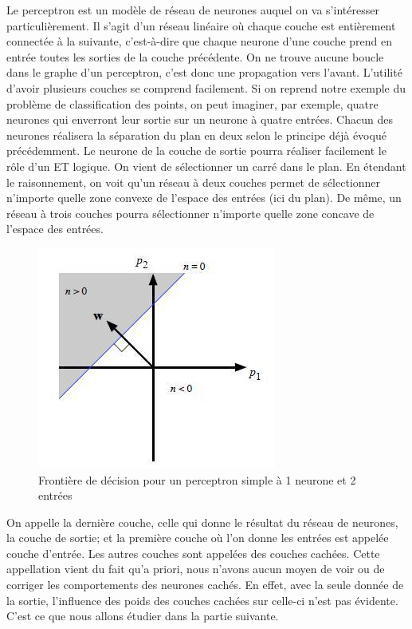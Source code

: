 Le perceptron est un modèle de réseau de neurones auquel on va s’intéresser particulièrement. Il s'agit d'un réseau linéaire où chaque couche est entièrement connectée à la suivante, c'est-à-dire que chaque neurone d'une couche prend en entrée toutes les sorties de la couche précédente. On ne trouve aucune boucle dans le graphe d'un perceptron, c'est donc une propagation vers l'avant.
L’utilité d’avoir plusieurs couches se comprend facilement. Si on reprend notre exemple du problème de classification des points, on peut imaginer, par exemple, quatre neurones qui enverront leur sortie sur un neurone à quatre entrées. Chacun des neurones réalisera la séparation du plan en deux selon le principe déjà évoqué précédemment. Le neurone de la couche de sortie pourra réaliser facilement le rôle d’un ET logique. On vient de sélectionner un carré dans le plan. En étendant le raisonnement, on voit qu’un réseau à deux couches permet de sélectionner n’importe quelle zone convexe de l’espace des entrées (ici du plan). De même, un réseau à trois couches pourra sélectionner n’importe quelle zone concave de l’espace des entrées.

\begin{figure}[ht]
  \centerline{\includegraphics[width=0.5\linewidth]{fig/espace1neurone.jpg}}
  \caption{Frontière de décision pour un perceptron simple à 1 neurone et 2 entrées}
  \label{fig:espace1neurone}
\end{figure}

On appelle la dernière couche, celle qui donne le résultat du réseau de neurones, la couche de sortie; et la première couche où l'on donne les entrées est appelée couche d'entrée. Les autres couches sont appelées des couches cachées. Cette appellation vient du fait qu’a priori, nous n’avons aucun moyen de voir ou de corriger les comportements des neurones cachés. En effet, avec la seule donnée de la sortie, l’influence des poids des couches cachées sur celle-ci n'est pas évidente. C'est ce que nous allons étudier dans la partie suivante. 




